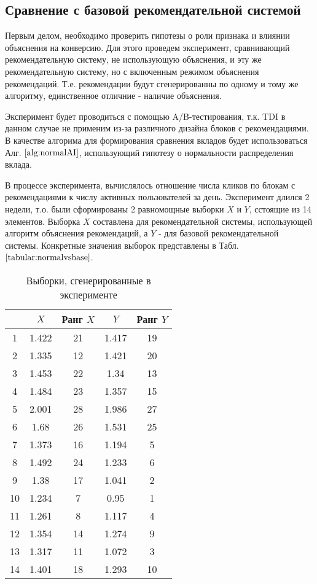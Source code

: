 \documentclass[12pt,a4paper]{report}
\begin{document}
\subsection{Сравнение с базовой рекомендательной системой}
Первым делом, необходимо проверить гипотезы о роли признака и влиянии объяснения на конверсию. Для этого проведем эксперимент, сравнивающий рекомендательную систему, не использующую объяснения, и эту же рекомендательную систему, но с включенным режимом объяснения рекомендаций. Т.е. рекомендации будут сгенерированны по одному и тому же алгоритму, единственное отличние - наличие объяснения.

Эксперимент будет проводиться с помощью A/B-тестирования, т.к. TDI в данном случае не применим из-за различного дизайна блоков с рекомендациями. В качестве алгорима для формирования сравнения вкладов будет использоваться Алг. $\ref{alg:normalAI}$, использующий гипотезу о нормальности распределения вклада.

В процессе эксперимента, вычислялось отношение числа кликов по блокам с рекомендациями к числу активных пользователей за день. Эксперимент длился 2 недели, т.о. были сформированы 2 равномощные выборки $X$ и $Y$, сстоящие из 14 элементов. Выборка $X$ составлена  для рекомендательной системы, использующей алгоритм объяснения рекомендаций, а $Y$ - для базовой рекомендательной системы. Конкретные значения выборок представлены в Табл. $\ref{tabular:normalvsbase}$.

\begin{table} [H]
\label{tabular:normalvsbase}
\begin{center}
\begin{tabular}{|c|c|c|c|c|}
\hline
 & $X$ & Ранг $X$ & $Y$ & Ранг $Y$   \\
\hline
1&1.422&21&1.417&19\\
\hline
2&1.335&12&1.421&20\\
\hline
3&1.453&22&1.34&13\\
\hline
4&1.484&23&1.357&15\\
\hline
5&2.001&28&1.986&27\\
\hline
6&1.68&26&1.531&25\\
\hline
7&1.373&16&1.194&5\\
\hline
8&1.492&24&1.233&6\\
\hline
9&1.38&17&1.041&2\\
\hline
10&1.234&7&0.95&1\\
\hline
11&1.261&8&1.117&4\\
\hline
12&1.354&14&1.274&9\\
\hline
13&1.317&11&1.072&3\\
\hline
14&1.401&18&1.293&10\\
\hline
\end{tabular}
\end{center}
\caption{Выборки, сгенерированные в эксперименте}
\end{table}
\end{document}
